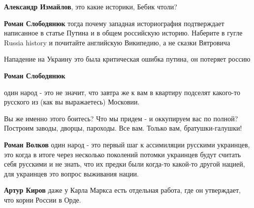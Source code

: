 \begin{itemize}
\begin{itemize}
\textbf{Александр Измайлов}, это какие историки, Бебик чтоли?

 
\textbf{Роман Слободянюк} тогда почему западная историография подтверждает написанное в статье Путина и в общем российскую историю. Наберите в гугле Russia history и почитайте английскую Википедию, а не сказки Вятровича

 
Нападение на Украину это была критическая ошибка путина, он потеряет россию

 
\textbf{Роман Слободянюк} 

один народ - это не значит, что завтра же к вам в квартиру подселят какого-то
русского из (как вы выражаетесь) Московии.

Вы же именно этого боитесь? Что мы придем - и оккупируем вас по полной?
Построим заводы, дворцы, пароходы. Все вам. Только вам, братушки-галушки!

 
\textbf{Роман Волков} один народ - это первый шаг к ассимиляции русскими украинцев, это когда в итоге через несколько поколений потомки украинцев будут считать себя русскими и не знать, что их предки были когда-то какой-то другой нацией, для украинцев это вопрос выживания нации.

 
\textbf{Артур Киров} даже у Карла Маркса есть отдельная работа, где он утверждает, что корни России в Орде.


\end{itemize}
\end{itemize}
